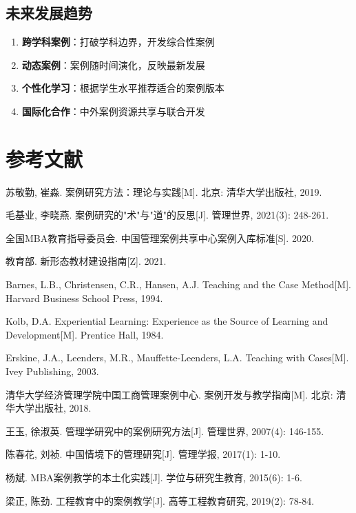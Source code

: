 \documentclass[12pt,a4paper]{ctexart}
\begin{document}
\subsection{未来发展趋势}

\begin{enumerate}[leftmargin=2em]
    \item \textbf{跨学科案例}：打破学科边界，开发综合性案例
    \item \textbf{动态案例}：案例随时间演化，反映最新发展
    \item \textbf{个性化学习}：根据学生水平推荐适合的案例版本
    \item \textbf{国际化合作}：中外案例资源共享与联合开发
\end{enumerate}

\newpage
\section*{参考文献}

\begin{enumerate}[leftmargin=2em, label={[\arabic*]}]
    \item 苏敬勤, 崔淼. 案例研究方法：理论与实践[M]. 北京: 清华大学出版社, 2019.
    \item 毛基业, 李晓燕. 案例研究的"术"与"道"的反思[J]. 管理世界, 2021(3): 248-261.
    \item 全国MBA教育指导委员会. 中国管理案例共享中心案例入库标准[S]. 2020.
    \item 教育部. 新形态教材建设指南[Z]. 2021.
    \item Barnes, L.B., Christensen, C.R., Hansen, A.J. Teaching and the Case Method[M]. Harvard Business School Press, 1994.
    \item Kolb, D.A. Experiential Learning: Experience as the Source of Learning and Development[M]. Prentice Hall, 1984.
    \item Erskine, J.A., Leenders, M.R., Mauffette-Leenders, L.A. Teaching with Cases[M]. Ivey Publishing, 2003.
    \item 清华大学经济管理学院中国工商管理案例中心. 案例开发与教学指南[M]. 北京: 清华大学出版社, 2018.
    \item 王玉, 徐淑英. 管理学研究中的案例研究方法[J]. 管理世界, 2007(4): 146-155.
    \item 陈春花, 刘祯. 中国情境下的管理研究[J]. 管理学报, 2017(1): 1-10.
    \item 杨斌. MBA案例教学的本土化实践[J]. 学位与研究生教育, 2015(6): 1-6.
    \item 梁正, 陈劲. 工程教育中的案例教学[J]. 高等工程教育研究, 2019(2): 78-84.
\end{enumerate}
\end{document}
